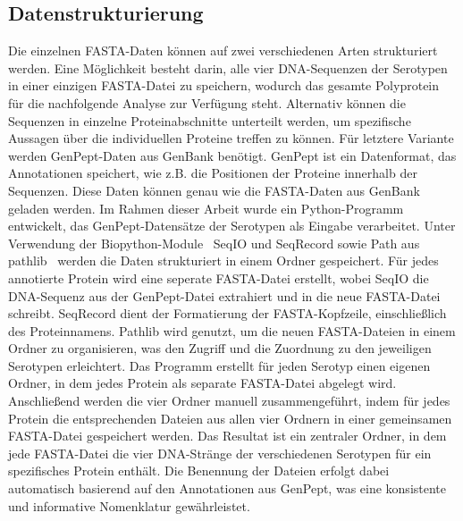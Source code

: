 \documentclass[german,version-2022-01]{uzl-thesis}
\begin{document}
\subsection{Datenstrukturierung}
Die einzelnen FASTA-Daten k\"onnen auf zwei verschiedenen Arten strukturiert werden. Eine M\"oglichkeit besteht darin, alle vier DNA-Sequenzen der Serotypen in einer einzigen FASTA-Datei zu speichern, wodurch das gesamte Polyprotein f\"ur die nachfolgende Analyse zur Verf\"ugung steht. Alternativ k\"onnen die Sequenzen in einzelne Proteinabschnitte unterteilt werden, um spezifische Aussagen \"uber die individuellen Proteine treffen zu k\"onnen. F\"ur letztere Variante werden GenPept-Daten aus GenBank ben\"otigt. GenPept ist ein Datenformat, das Annotationen speichert, wie z.B. die Positionen der Proteine innerhalb der Sequenzen. Diese Daten k\"onnen genau wie die FASTA-Daten aus GenBank geladen werden. Im Rahmen dieser Arbeit wurde ein Python-Programm~\cite{python} entwickelt, das GenPept-Datens\"atze der Serotypen als Eingabe verarbeitet. Unter Verwendung der Biopython-Module~\cite{cock2009biopython} SeqIO und SeqRecord sowie Path aus pathlib~\cite{pathlib} werden die Daten strukturiert in einem Ordner gespeichert. F\"ur jedes annotierte Protein wird eine seperate FASTA-Datei erstellt, wobei SeqIO die DNA-Sequenz aus der GenPept-Datei extrahiert und in die neue FASTA-Datei schreibt. SeqRecord dient der Formatierung der FASTA-Kopfzeile, einschlie\ss{}lich des Proteinnamens. Pathlib wird genutzt, um die neuen FASTA-Dateien in einem Ordner zu organisieren, was den Zugriff und die Zuordnung zu den jeweiligen Serotypen erleichtert. Das Programm erstellt f\"ur jeden Serotyp einen eigenen Ordner, in dem jedes Protein als separate FASTA-Datei abgelegt wird. Anschlie\ss{}end werden die vier Ordner manuell zusammengef\"uhrt, indem f\"ur jedes Protein die entsprechenden Dateien aus allen vier Ordnern in einer gemeinsamen FASTA-Datei gespeichert werden. Das Resultat ist ein zentraler Ordner, in dem jede FASTA-Datei die vier DNA-Str\"ange der verschiedenen Serotypen f\"ur ein spezifisches Protein enth\"alt. Die Benennung der Dateien erfolgt dabei automatisch basierend auf den Annotationen aus GenPept, was eine konsistente und informative Nomenklatur gew\"ahrleistet.
\end{document}
